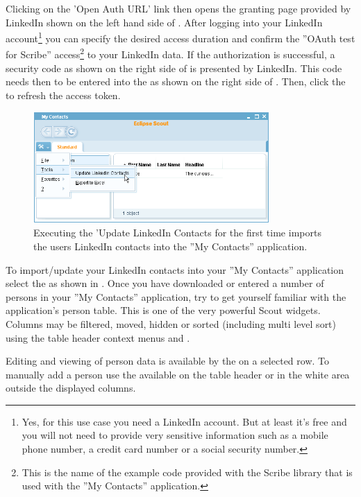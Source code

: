 \documentclass[a4paper,10pt,twoside]{book}
\begin{document}
Clicking on the 'Open Auth URL' link then opens the granting page provided by LinkedIn shown on the left hand side of . 
After logging into your LinkedIn account\footnote{
Yes, for this use case you need a LinkedIn account. But at least it's free and you will not need to provide very sensitive information such as a mobile phone number, a credit card number or a social security number. 
}
you can specify the desired access duration and confirm the ''OAuth test for Scribe'' access\footnote{
This is the name of the example code provided with the Scribe library that is used with the ''My Contacts'' application. 
} 
to your LinkedIn data.
If the authorization is successful, a security code as shown on the right side of  is presented by LinkedIn. 
This code needs then to be entered into the  as shown on the right side of . 
Then, click the  to refresh the access token. 

\begin{figure}
\includegraphics[width=9cm]{my_contacts_rayo_updatecontacts.png} \hspace{5mm}
\caption{Executing the 'Update LinkedIn Contacts for the first time imports the users LinkedIn contacts into the ''My Contacts'' application.}
\end{figure}

To import/update your LinkedIn contacts into your ''My Contacts'' application select the  as shown in .
Once you have downloaded or entered a number of persons in your ''My Contacts'' application, try to get yourself familiar with the application's person table. 
This is one of the very powerful Scout widgets. 
Columns may be filtered, moved, hidden or sorted (including multi level sort) using the table header context menus   and .

Editing and viewing of person data is available by the  on a selected row.
To manually add a person use the  available on the table header or in the white area outside the displayed columns. 
\end{document}

